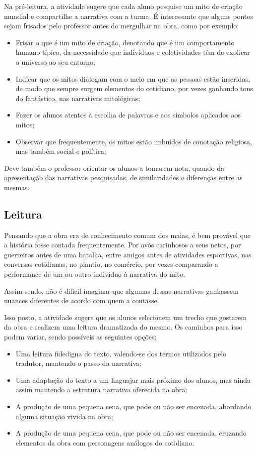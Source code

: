 \documentclass[12pt]{extarticle}
\begin{document}
Na pré-leitura, a atividade sugere que cada aluno pesquise um mito de
criação mundial e compartilhe a narrativa com a turma. É interessante
que alguns pontos sejam frisados pelo professor antes do mergulhar na
obra, como por exemplo:

\begin{itemize}
\item
  Frisar o que é um mito de criação, denotando que é um comportamento
  humano típico, da necessidade que indivíduos e coletividades têm de
  explicar o universo ao seu entorno;
\item
  Indicar que os mitos dialogam com o meio em que as pessoas estão
  inseridas, de modo que sempre surgem elementos do cotidiano, por vezes
  ganhando tons do fantástico, nas narrativas mitológicas;
\item
  Fazer os alunos atentos à escolha de palavras e aos símbolos aplicados
  aos mitos;
\item
  Observar que frequentemente, os mitos estão imbuídos de conotação
  religiosa, mas também social e política;
\end{itemize}

Deve também o professor orientar os alunos a tomarem nota, quando da
apresentação das narrativas pesquisadas, de similaridades e diferenças
entre as mesmas.

\subsection{Leitura}


Pensando que a obra era de conhecimento comum dos maias, é
bem provável que a história fosse contada frequentemente. Por avós
carinhosos a seus netos, por guerreiros antes de uma batalha, entre
amigos antes de atividades esportivas, nas conversas cotidianas, no
plantio, no comércio, por vezes comparando a performance de um ou outro
indivíduo à narrativa do mito.

Assim sendo, não é difícil imaginar que algumas dessas narrativas
ganhassem nuances diferentes de acordo com quem a contasse.

Isso posto, a atividade sugere que os alunos selecionem um trecho que
gostarem da obra e realizem uma leitura dramatizada do mesmo. Os
caminhos para isso podem variar, sendo possíveis as seguintes opções:

\begin{itemize}
\item
  Uma leitura fidedigna do texto, valendo-se dos termos utilizados pelo
  tradutor, mantendo o passo da narrativa;
\item
  Uma adaptação do texto a um linguajar mais próximo dos alunos, mas
  ainda assim mantendo a estrutura narrativa oferecida na obra;
\item
  A produção de uma pequena cena, que pode ou não ser encenada,
  abordando alguma situação vivida na obra;
\item
  A produção de uma pequena cena, que pode ou não ser encenada, cruzando
  elementos da obra com personagens análogos do cotidiano.
\end{itemize}
\end{document}
